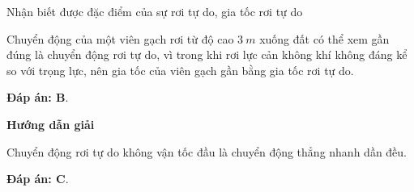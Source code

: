 \begin{dang}{Nhận biết được đặc điểm của sự rơi tự do, gia tốc rơi tự do}
{		Chuyển động của một viên gạch rơi từ độ cao $\SI{3}{m}$ xuống đất có thể xem gần đúng là chuyển động rơi tự do, vì trong khi rơi lực cản không khí không đáng kể so với trọng lực, nên gia tốc của viên gạch gần bằng gia tốc rơi tự do.
		
		\textbf{Đáp án: B}.
	}
	
	{	\begin{center}
			\textbf{Hướng dẫn giải}
		\end{center}
		
		Chuyển động rơi tự do không vận tốc đầu là chuyển động thẳng nhanh dần đều.
		
		\textbf{Đáp án: C}.
	}
	
\end{dang}
	
	
	

	
